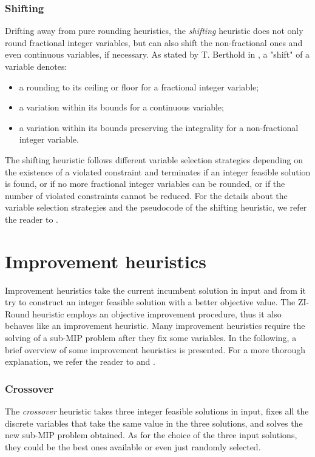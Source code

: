 \documentclass[a4paper,12pt,twoside]{scrbook}
\begin{document}
\subsubsection{Shifting}
Drifting away from pure rounding heuristics, the \textit{shifting} heuristic does not only round fractional integer variables, but can also shift the non-fractional ones and even continuous variables, if necessary.
As stated by T. Berthold in \cite{berthold2006}, a "shift" of a variable denotes:
\begin{itemize}
	\item a rounding to its ceiling or floor for a fractional integer variable;
	\item a variation within its bounds for a continuous variable;
	\item a variation within its bounds preserving the integrality for a non-fractional integer variable.
\end{itemize}
The shifting heuristic follows different variable selection strategies depending on the existence of a violated constraint and terminates if an integer feasible solution is found, or if no more fractional integer variables can be rounded, or if the number of violated constraints cannot be reduced. For the details about the variable selection strategies and the pseudocode of the shifting heuristic, we refer the reader to \cite{berthold2006}. 

\section{Improvement heuristics} \label{sec:improvementheur}
Improvement heuristics take the current incumbent solution in input and from it try to construct an integer feasible solution with a better objective value. The ZI-Round heuristic employs an objective improvement procedure, thus it also behaves like an improvement heuristic. Many improvement heuristics require the solving of a sub-MIP problem after they fix some variables. In the following, a brief overview of some improvement heuristics is presented. For a more thorough explanation, we refer the reader to \cite{hendel2011} and \cite{achterberg2012}. \par 
\subsubsection{Crossover}
The \textit{crossover} heuristic takes three integer feasible solutions in input, fixes all the discrete variables that take the same value in the three solutions, and solves the new sub-MIP problem obtained. As for the choice of the three input solutions, they could be the best ones available or even just randomly selected.
\end{document}

